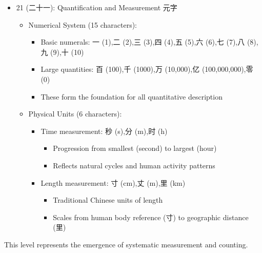\documentclass[11pt,letterpaper]{article}
\begin{document}
\begin{itemize}
\tightlist
\item
  21 (二十一): Quantification and Measurement 元字

  \begin{itemize}
  \tightlist
  \item
    Numerical System (15 characters):

    \begin{itemize}
    \tightlist
    \item
      Basic numerals: 一 (1),二 (2),三 (3),四 (4),五 (5),六 (6),七
      (7),八 (8),九 (9),十 (10)
    \item
      Large quantities: 百 (100),千 (1000),万 (10,000),亿
      (100,000,000),零 (0)
    \item
      These form the foundation for all quantitative description
    \end{itemize}
  \item
    Physical Units (6 characters):

    \begin{itemize}
    \tightlist
    \item
      Time measurement: 秒 (s),分 (m),时 (h)

      \begin{itemize}
      \tightlist
      \item
        Progression from smallest (second) to largest (hour)
      \item
        Reflects natural cycles and human activity patterns
      \end{itemize}
    \item
      Length measurement: 寸 (cm),丈 (m),里 (km)

      \begin{itemize}
      \tightlist
      \item
        Traditional Chinese units of length
      \item
        Scales from human body reference (寸) to geographic distance
        (里)
      \end{itemize}
    \end{itemize}
  \end{itemize}
\end{itemize}

This level represents the emergence of systematic measurement and
counting.
\end{document}
